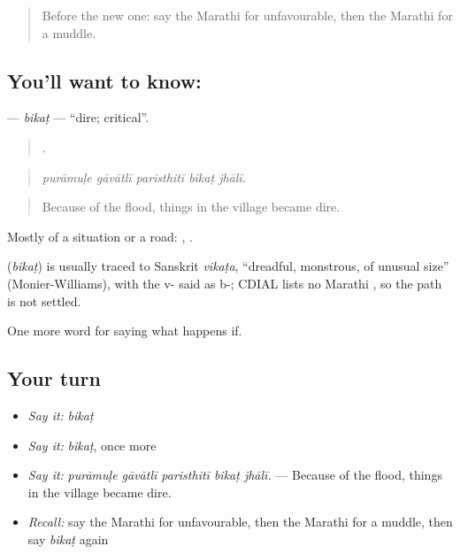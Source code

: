 \label{lesson:MR-C556-bikat}



\begin{quote}
Before the new one: say the Marathi for unfavourable, then the Marathi for a muddle.
\end{quote}

\subsection*{You'll want to know: }
\textbf{} — \emph{bikaṭ} — \textquotedblleft{}dire; critical\textquotedblright{}.

\begin{quote}
    .
\end{quote}

\begin{quote}
\emph{purāmuḷe gāvātlī paristhitī bikaṭ jhālī.}
\end{quote}

\begin{quote}
Because of the flood, things in the village became dire.
\end{quote}

Mostly of a situation or a road:  ,  .

\begin{cousinweb}
\textbf{} (\emph{bikaṭ}) is usually traced to Sanskrit \emph{vikaṭa}, \textquotedblleft{}dreadful, monstrous, of unusual size\textquotedblright{} (Monier-Williams), with the v- said as b-; CDIAL lists no Marathi , so the path is not settled.
\end{cousinweb}

\begin{grammarlens}[title={What you've built}]
One more word for saying what happens if.
\end{grammarlens}

\subsection*{Your turn}
\begin{itemize}
\raggedright
  \item \emph{Say it:} \emph{bikaṭ}
  \item \emph{Say it:} \emph{bikaṭ}, once more
  \item \emph{Say it:} \emph{purāmuḷe gāvātlī paristhitī bikaṭ jhālī.} — Because of the flood, things in the village became dire.
  \item \emph{Recall:} say the Marathi for unfavourable, then the Marathi for a muddle, then say \emph{bikaṭ} again
\end{itemize}

